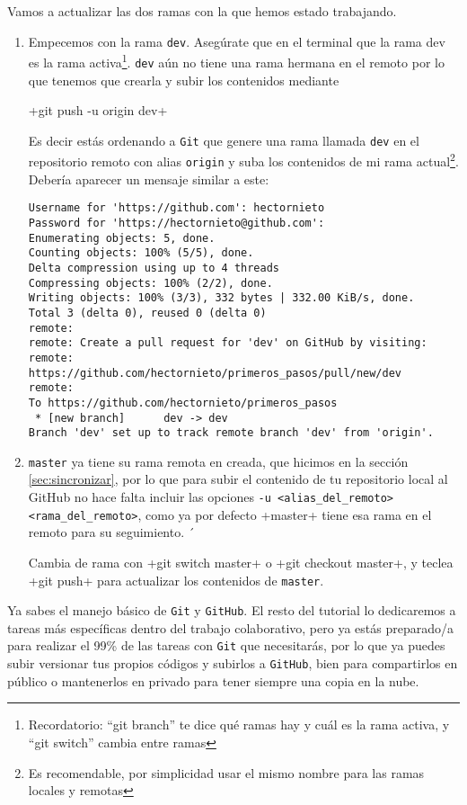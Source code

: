 \documentclass[a5paper,10pt]{article}
\begin{document}
    Vamos a actualizar las dos ramas con la que hemos estado trabajando. 
    \begin{enumerate}
    
     \item Empecemos con la rama \verb+dev+. Asegúrate que en el terminal que la rama dev es la rama activa\footnote{Recordatorio: ``git branch'' te dice qué ramas hay y cuál es la rama activa, y ``git switch'' cambia entre ramas}. \verb+dev+ aún no tiene una rama hermana en el remoto por lo que tenemos que crearla y subir los contenidos mediante
     
     \cverb+git push -u origin dev+
     
     Es decir estás ordenando a \verb+Git+ que genere una rama llamada \verb+dev+ en el repositorio remoto con alias \verb+origin+ y suba los contenidos de mi rama actual\footnote{Es recomendable, por simplicidad usar el mismo nombre para las ramas locales y remotas}. Debería aparecer un mensaje similar a este:
     \begin{lstlisting}[style=custom]
Username for 'https://github.com': hectornieto
Password for 'https://hectornieto@github.com': 
Enumerating objects: 5, done.
Counting objects: 100% (5/5), done.
Delta compression using up to 4 threads
Compressing objects: 100% (2/2), done.
Writing objects: 100% (3/3), 332 bytes | 332.00 KiB/s, done.
Total 3 (delta 0), reused 0 (delta 0)
remote: 
remote: Create a pull request for 'dev' on GitHub by visiting:
remote:      https://github.com/hectornieto/primeros_pasos/pull/new/dev
remote: 
To https://github.com/hectornieto/primeros_pasos
 * [new branch]      dev -> dev
Branch 'dev' set up to track remote branch 'dev' from 'origin'.
     \end{lstlisting}

     
     \item \verb+master+ ya tiene su rama remota en creada, que hicimos en la sección \ref{sec:sincronizar}, por lo que para subir el contenido de tu repositorio local al GitHub no hace falta incluir las opciones \verb+-u <alias_del_remoto> <rama_del_remoto>+, como ya por defecto \cverb+master+ tiene esa rama en el remoto para su seguimiento. ´
     
     Cambia de rama con \cverb+git switch master+ o \cverb+git checkout master+, y teclea \cverb+git push+ para actualizar los contenidos de \verb+master+.
     
    \end{enumerate}
      
    Ya sabes el manejo básico de \verb+Git+ y \verb+GitHub+. El resto del tutorial lo dedicaremos a tareas más específicas dentro del trabajo colaborativo, pero ya estás preparado/a para realizar el 99\% de las tareas con \verb+Git+ que necesitarás, por lo que ya puedes subir versionar tus propios códigos  y subirlos a \verb+GitHub+, bien para compartirlos en público o mantenerlos en privado para tener siempre una copia en la nube.
\end{document}
